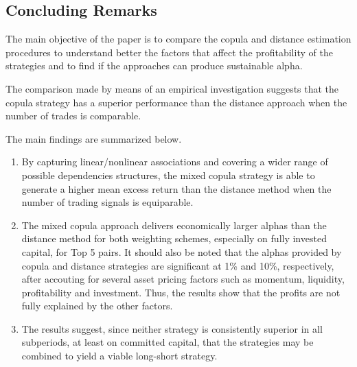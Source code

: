 \documentclass[a4paper,12pt]{report}
\begin{document}
\begin{refsection}
\vspace{1.0cm}
	
	\section{Concluding Remarks}
	
The main objective of the paper is to compare the copula and distance estimation procedures to understand better the factors that affect the profitability of the strategies and to find if the approaches can produce sustainable alpha.

The comparison made by means of an empirical investigation suggests that the copula strategy has a superior performance than the distance approach when the number of trades is comparable.

The main findings are summarized below.

\begin{enumerate}
	
	
	\item By capturing linear/nonlinear associations and covering a wider range of possible dependencies structures, the mixed copula strategy is able to generate a higher mean excess return than the distance method when the number of trading signals is equiparable.
	
	\vspace{0.3cm}
	
	\item 	The mixed copula approach delivers economically larger alphas than the distance method for both weighting schemes, especially on fully invested capital, for Top 5 pairs. It should also be noted that the alphas provided by copula and distance strategies are significant at 1\% and 10\%, respectively, after accouting for several asset pricing factors such as momentum, liquidity, profitability and investment. Thus, the results show that the profits are not fully explained by the other factors.
	
	\vspace{0.3cm}
	
	
	\item	The results suggest, since neither strategy is consistently superior in all subperiods, at least on committed capital, that the strategies may be combined to yield a viable long-short strategy.
	
\end{enumerate}

\vspace{0.3cm}


\end{refsection}
\end{document}
